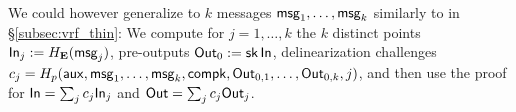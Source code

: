 We could however generalize \PedVRF to $k$ messages $\mathsf{msg}_1,\ldots,\mathsf{msg}_k$
similarly to \ThinVRF in \S\ref{subsec:vrf_thin}:  We compute for
$j=1,\ldots,k$ the $k$ distinct
points ${\mathsf{In}}_j := H_{{\mathbf{E}}}(\mathsf{msg}_j)$, pre-outputs ${\mathsf{Out}}_0 := \mathsf{sk} \, {\mathsf{In}}$,
delinearization challenges
 $c_j = H_p(\mathsf{aux},\mathsf{msg}_1,\ldots,\mathsf{msg}_k,\mathsf{compk},{\mathsf{Out}}_{0,1},\ldots,{\mathsf{Out}}_{0,k},j)$,
and then use the \PedVRF proof for
 ${\mathsf{In}} = \sum_j c_j {\mathsf{In}}_j$ and ${\mathsf{Out}} = \sum_j c_j {\mathsf{Out}}_j$.



\endinput










\begin{proof}[Proof sketch]
	Correctness holds trivially.
	
	???
\end{proof}





